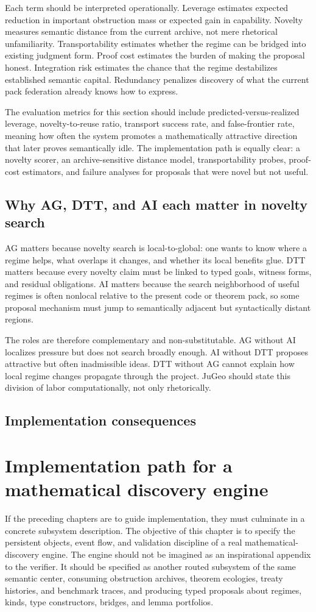 \documentclass[11pt]{report}
\begin{document}
Each term should be interpreted operationally. Leverage estimates expected reduction in important obstruction mass or expected gain in capability. Novelty measures semantic distance from the current archive, not mere rhetorical unfamiliarity. Transportability estimates whether the regime can be bridged into existing judgment form. Proof cost estimates the burden of making the proposal honest. Integration risk estimates the chance that the regime destabilizes established semantic capital. Redundancy penalizes discovery of what the current pack federation already knows how to express.

The evaluation metrics for this section should include predicted-versus-realized leverage, novelty-to-reuse ratio, transport success rate, and false-frontier rate, meaning how often the system promotes a mathematically attractive direction that later proves semantically idle. The implementation path is equally clear: a novelty scorer, an archive-sensitive distance model, transportability probes, proof-cost estimators, and failure analyses for proposals that were novel but not useful.
\section{Why AG, DTT, and AI each matter in novelty search}
AG matters because novelty search is local-to-global: one wants to know where a regime helps, what overlaps it changes, and whether its local benefits glue. DTT matters because every novelty claim must be linked to typed goals, witness forms, and residual obligations. AI matters because the search neighborhood of useful regimes is often nonlocal relative to the present code or theorem pack, so some proposal mechanism must jump to semantically adjacent but syntactically distant regions.

The roles are therefore complementary and non-substitutable. AG without AI localizes pressure but does not search broadly enough. AI without DTT proposes attractive but often inadmissible ideas. DTT without AG cannot explain how local regime changes propagate through the project. JuGeo should state this division of labor computationally, not only rhetorically.

\section{Implementation consequences}
\chapter{Implementation path for a mathematical discovery engine}
If the preceding chapters are to guide implementation, they must culminate in a concrete subsystem description. The objective of this chapter is to specify the persistent objects, event flow, and validation discipline of a real mathematical-discovery engine. The engine should not be imagined as an inspirational appendix to the verifier. It should be specified as another routed subsystem of the same semantic center, consuming obstruction archives, theorem ecologies, treaty histories, and benchmark traces, and producing typed proposals about regimes, kinds, type constructors, bridges, and lemma portfolios.
\end{document}
